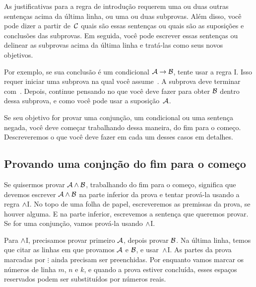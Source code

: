  As justificativas para a regra de introdu\c c\~ao requerem uma ou duas outras senten\c cas acima da \'ultima linha, ou uma ou duas subprovas. Al\'em disso, voc\^e pode dizer a partir de~$\mathcal{C}$ quais s\~ao essas senten\c cas ou quais s\~ao as suposi\c c\~oes e conclus\~oes das subprovas. Em seguida, voc\^e pode escrever essas senten\c cas ou delinear as subprovas acima da \'ultima linha e trat\'a-las como seus novos objetivos.

 Por exemplo, se sua conclus\~ao \'e um condicional $\mathcal{A}\rightarrow\mathcal{B}$,  tente usar a regra {\eif}I.  Isso requer iniciar uma subprova na qual voc\^e assume~. A subprova deve terminar com~. Depois, continue pensando no que voc\^e deve fazer para obter $\mathcal{B}$ dentro dessa subprova,  e como voc\^e pode usar a suposi\c c\~ao~$\mathcal{A}$.

 Se seu objetivo for provar uma conjun\c c\~ao, um condicional ou uma senten\c ca negada, voc\^e deve come\c car trabalhando dessa maneira, do fim para o come\c co. Descreveremos o que voc\^e deve fazer em cada um desses casos em detalhes.
 
\subsection*{Provando uma conjn\c c\~ao do fim para o come\c co}

Se quisermos provar  $\mathcal{A} \wedge \mathcal{B}$,  trabalhando do fim para o come\c co, significa que devemos escrever $\mathcal{A} \wedge \mathcal{B}$ na parte inferior da prova e tentar prov\'a-la usando a regra $\wedge$I. No topo de uma folha de papel, escreveremos as premissas  da prova, se houver alguma. E  na parte inferior, escrevemos a senten\c ca que queremos provar. Se for uma conjun\c c\~ao, vamos prov\'a-la usando $\wedge$I.
  \begin{fitchproof}
	\ellipsesline 
\ellipsesline
    \ellipsesline 
  \end{fitchproof}
Para $\wedge$I, precisamos provar primeiro $\mathcal{A}$, depois provar $\mathcal{B}$. Na \'ultima linha, temos que citar as linhas em que provamos $\mathcal{A}$ e  $\mathcal{B}$, e usar~$\wedge$I. As partes da prova marcadas por $\vdots$ ainda precisam ser preenchidas.
Por enquanto vamos marcar os n\'umeros de linha $m$, $n$ e $k$, e quando a prova estiver conclu\'ida, esses espa\c cos reservados podem ser substitu\'idos por n\'umeros reais.
 

